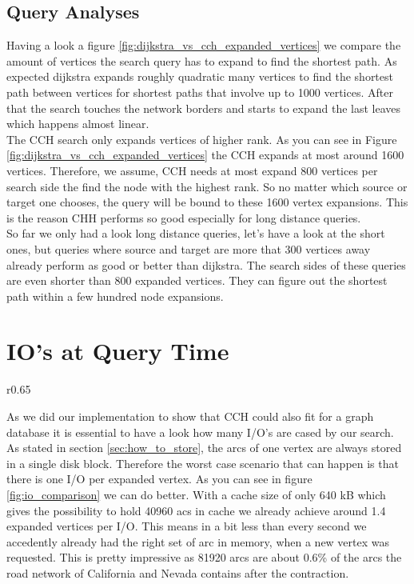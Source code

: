 

\subsection{Query Analyses}

Having a look a figure \ref{fig:dijkstra_vs_cch_expanded_vertices} we compare the amount of vertices the search query has to expand to find the shortest path.
As expected dijkstra expands roughly quadratic many vertices to find the shortest path between vertices for shortest paths that involve up to 1000 vertices.
After that the search touches the network borders and starts to expand the last leaves which happens almost linear.\\
The CCH search only expands vertices of higher rank.
As you can see in Figure \ref{fig:dijkstra_vs_cch_expanded_vertices} the CCH expands at most around 1600 vertices.
Therefore, we assume, CCH needs at most expand 800 vertices per search side the find the node with the highest rank.
So no matter which source or target one chooses, the query will be bound to these 1600 vertex expansions.
This is the reason CHH performs so good especially for long distance queries.
\\
So far we only had a look long distance queries, let's have a look at the short ones, but queries where source and target are more that 300 vertices away already perform as good or better than dijkstra.
The search sides of these queries are even shorter than 800 expanded vertices.
They can figure out the shortest path within a few hundred node expansions.



\section{IO's at Query Time}

\begin{wrapfigure}{r}{0.65\textwidth}    
    
    \caption{I/O's over Expanded Vertices for 40kB cache size per search side.}
    \label{fig:io_comparison}
\end{wrapfigure}

As we did our implementation to show that CCH could also fit for a graph database it is essential to have a look how many I/O's are cased by our search.
As stated in section \ref{sec:how_to_store}, the arcs of one vertex are always stored in a single disk block.
Therefore the worst case scenario that can happen is that there is one I/O per expanded vertex.
As you can see in figure \ref{fig:io_comparison} we can do better.
With a cache size of only 640 kB which gives the possibility to hold 40960 acs in cache we already achieve around 1.4 expanded vertices per I/O.
This means in a bit less than every second we accedently already had the right set of arc in memory, when a new vertex was requested.
This is pretty impressive as 81920 arcs are about 0.6\%  of the arcs the road network of California and Nevada contains after the contraction.


